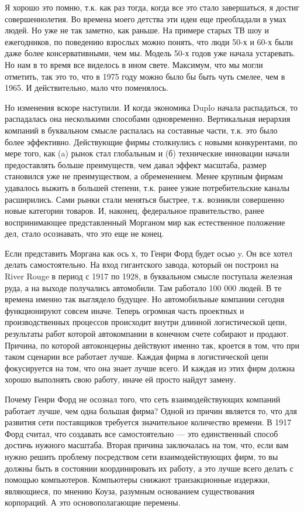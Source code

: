 \documentclass[ebook,12pt,oneside,openany]{memoir}
\begin{document}
Я хорошо это помню, т.к. как раз тогда, когда все это стало
завершаться, я достиг совершеннолетия. Во времена моего детства эти
идеи еще преобладали в умах людей. Но уже не так заметно, как раньше.
На примере старых ТВ шоу и ежегодников, по поведению взрослых можно
понять, что люди 50-х и 60-х были даже более консервативными, чем мы.
Модель 50-х годов уже начала устаревать. Но нам в то время все
виделось в ином свете. Максимум, что мы могли отметить, так это то,
что в 1975 году можно было бы быть чуть смелее, чем в 1965. И
действительно, мало что поменялось. \newline

Но изменения вскоре наступили. И когда экономика Duplo начала
распадаться, то распадалась она несколькими способами одновременно.
Вертикальная иерархия компаний в буквальном смысле распалась на
составные части, т.к. это было более эффективно. Действующие фирмы
столкнулись с новыми конкурентами, по мере того, как (a) рынок стал
глобальным и (б) технические инновации начали предоставлять больше
преимуществ, чем давал эффект масштаба, размер становился уже не
преимуществом, а обременением. Менее крупным фирмам удавалось выжить в
большей степени, т.к. ранее узкие потребительские каналы расширились.
Сами рынки стали меняться быстрее, т.к. возникли совершенно новые
категории товаров. И, наконец, федеральное правительство, ранее
воспринимающее представленный Морганом мир как естественное положение
дел, стало осознавать, что это еще не конец. \newline

Если представить Моргана как ось х, то Генри Форд будет осью y. Он все
хотел делать самостоятельно. На вход гигантского завода, который он
построил на River Rouge в период с 1917 по 1928, в буквальном смысле
поступала железная руда, а на выходе получались автомобили. Там
работало 100 000 людей. В те времена именно так выглядело будущее. Но
автомобильные компании сегодня функционируют совсем иначе. Теперь
огромная часть проектных и производственных процессов происходит
внутри длинной логистической цепи, результаты работ которой
автокомпании в конечном счете собирают и продают. Причина, по которой
автоконцерны действуют именно так, кроется в том, что при таком
сценарии все работает лучше. Каждая фирма в логистической цепи
фокусируется на том, что она знает лучше всего. И каждая из этих фирм
должна хорошо выполнять свою работу, иначе ей просто найдут замену. \newline

Почему Генри Форд не осознал того, что сеть взаимодействующих компаний
работает лучше, чем одна большая фирма? Одной из причин является то,
что для развития сети поставщиков требуется значительное количество
времени. В 1917 Форд считал, что создавать все самостоятельно — это
единственный способ достичь нужного масштаба. Вторая причина
заключалась на том, что, если вам нужно решить проблему посредством
сети взаимодействующих фирм, то вы должны быть в состоянии
координировать их работу, а это лучше всего делать с помощью
компьютеров. Компьютеры снижают транзакционные издержки, являющиеся,
по мнению Коуза, разумным основанием существования корпораций. А это
основополагающие перемены. \newline
\end{document}
